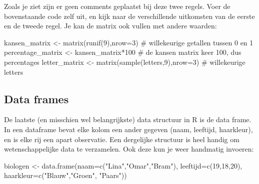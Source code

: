 \documentclass[
  b5paper,
  DIV=11,
  numbers=noendperiod]{scrreprt}
\newenvironment{Shaded}{\begin{snugshade}}{\end{snugshade}}
\newcommand{\AttributeTok}[1]{\textcolor[rgb]{0.40,0.45,0.13}{#1}}
\newcommand{\CommentTok}[1]{\textcolor[rgb]{0.37,0.37,0.37}{#1}}
\newcommand{\DecValTok}[1]{\textcolor[rgb]{0.68,0.00,0.00}{#1}}
\newcommand{\FunctionTok}[1]{\textcolor[rgb]{0.28,0.35,0.67}{#1}}
\newcommand{\NormalTok}[1]{\textcolor[rgb]{0.00,0.23,0.31}{#1}}
\newcommand{\OtherTok}[1]{\textcolor[rgb]{0.00,0.23,0.31}{#1}}
\newcommand{\SpecialCharTok}[1]{\textcolor[rgb]{0.37,0.37,0.37}{#1}}
\newcommand{\StringTok}[1]{\textcolor[rgb]{0.13,0.47,0.30}{#1}}
\theoremstyle{definition}
\theoremstyle{remark}
\begin{document}
Zoals je ziet zijn er geen comments geplaatst bij deze twee regels. Voer
de bovenstaande code zelf uit, en kijk naar de verschillende uitkomsten
van de eerste en de tweede regel. Je kan de matrix ook vullen met andere
waarden:

\begin{Shaded}
\begin{Highlighting}[]
\NormalTok{kansen\_matrix }\OtherTok{\textless{}{-}} \FunctionTok{matrix}\NormalTok{(}\FunctionTok{runif}\NormalTok{(}\DecValTok{9}\NormalTok{),}\AttributeTok{nrow=}\DecValTok{3}\NormalTok{) }\CommentTok{\# willekeurige getallen tussen 0 en 1}
\NormalTok{percentage\_matrix }\OtherTok{\textless{}{-}}\NormalTok{ kansen\_matrix}\SpecialCharTok{*}\DecValTok{100}   \CommentTok{\# de kansen matrix keer 100, dus percentages}
\NormalTok{letter\_matrix }\OtherTok{\textless{}{-}} \FunctionTok{matrix}\NormalTok{(}\FunctionTok{sample}\NormalTok{(letters,}\DecValTok{9}\NormalTok{),}\AttributeTok{nrow=}\DecValTok{3}\NormalTok{) }\CommentTok{\# willekeurige letters}
\end{Highlighting}
\end{Shaded}

\subsection{Data frames}\label{data-frames}

De laatste (en misschien wel belangrijkste) data structuur in R is de
data frame. In een dataframe bevat elke kolom een ander gegeven (naam,
leeftijd, haarkleur), en is elke rij een apart observatie. Een
dergelijke structuur is heel handig om wetenschappelijke data te
verzamelen. Ook deze kun je weer handmatig invoeren:

\begin{Shaded}
\begin{Highlighting}[]
\NormalTok{biologen }\OtherTok{\textless{}{-}} \FunctionTok{data.frame}\NormalTok{(}\AttributeTok{naam=}\FunctionTok{c}\NormalTok{(}\StringTok{"Lina"}\NormalTok{,}\StringTok{"Omar"}\NormalTok{,}\StringTok{"Bram"}\NormalTok{),}
                       \AttributeTok{leeftijd=}\FunctionTok{c}\NormalTok{(}\DecValTok{19}\NormalTok{,}\DecValTok{18}\NormalTok{,}\DecValTok{20}\NormalTok{), }
                       \AttributeTok{haarkleur=}\FunctionTok{c}\NormalTok{(}\StringTok{"Blauw"}\NormalTok{,}\StringTok{"Groen"}\NormalTok{, }\StringTok{"Paars"}\NormalTok{))}
\end{Highlighting}
\end{Shaded}
\end{document}
